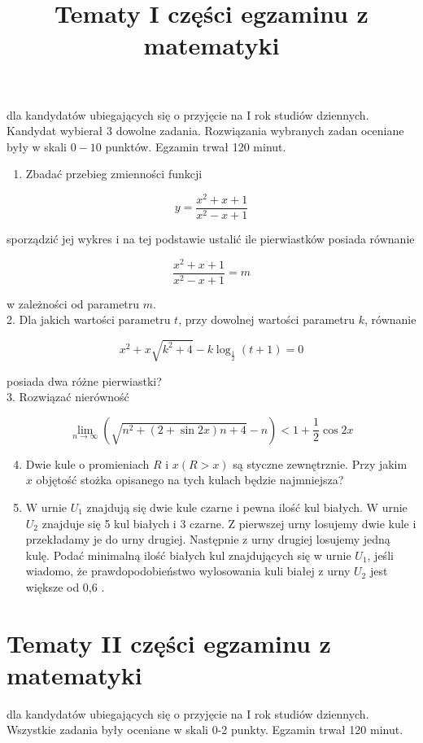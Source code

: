 \documentclass[10pt]{article}
\title{Tematy I części egzaminu z matematyki }
\author{}
\date{}
\begin{document}
\maketitle
dla kandydatów ubiegających się o przyjęcie na I rok studiów dziennych.\\
Kandydat wybierał 3 dowolne zadania. Rozwiązania wybranych zadan oceniane były w skali \(0-10\) punktów. Egzamin trwał 120 minut.

\begin{enumerate}
  \item Zbadać przebieg zmienności funkcji
\end{enumerate}

\[
y=\frac{x^{2}+x+1}{x^{2}-x+1}
\]

sporządzić jej wykres i na tej podstawie ustalić ile pierwiastków posiada równanie

\[
\frac{x^{2}+x+1}{x^{2}-x+1}=m
\]

w zależności od parametru \(m\).\\
2. Dla jakich wartości parametru \(t\), przy dowolnej wartości parametru \(k\), równanie

\[
x^{2}+x \sqrt{k^{2}+4}-k \log _{\frac{1}{2}}(t+1)=0
\]

posiada dwa różne pierwiastki?\\
3. Rozwiązać nierówność

\[
\lim _{n \rightarrow \infty}\left(\sqrt{n^{2}+(2+\sin 2 x) n+4}-n\right)<1+\frac{1}{2} \cos 2 x
\]

\begin{enumerate}
  \setcounter{enumi}{3}
  \item Dwie kule o promieniach \(R\) i \(x(R>x)\) są styczne zewnętrznie. Przy jakim \(x\) objętość stożka opisanego na tych kulach będzie najmniejsza?
  \item W urnie \(U_{1}\) znajdują się dwie kule czarne i pewna ilość kul białych. W urnie \(U_{2}\) znajduje się 5 kul białych i 3 czarne. Z pierwszej urny losujemy dwie kule i przekładamy je do urny drugiej. Następnie z urny drugiej losujemy jedną kulę. Podać minimalną ilość białych kul znajdujących się w urnie \(U_{1}\), jeśli wiadomo, że prawdopodobieństwo wylosowania kuli białej z urny \(U_{2}\) jest większe od 0,6 .
\end{enumerate}

\section*{Tematy II części egzaminu z matematyki}
dla kandydatów ubiegających się o przyjęcie na I rok studiów dziennych.\\
Wszystkie zadania były oceniane w skali 0-2 punkty. Egzamin trwał 120 minut.
\end{document}
